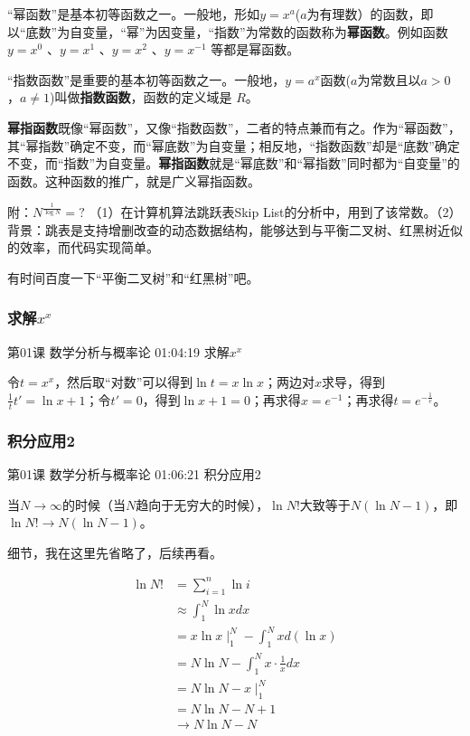 \documentclass[UTF8]{ctexart}
\begin{document}
“幂函数”是基本初等函数之一。一般地，形如$y=x^{a}$($a$为有理数）的函数，即以“底数”为自变量，“幂”为因变量，“指数”为常数的函数称为\textbf{幂函数}。例如函数$y=x^{0}$ 、$y=x^{1}$ 、$y=x^{2}$ 、$y=x^{-1}$ 等都是幂函数。

“指数函数”是重要的基本初等函数之一。一般地，$y=a^{x}$函数($a$为常数且以$a>0$，$a \neq 1$)叫做\textbf{指数函数}，函数的定义域是 $R$。

\textbf{幂指函数}既像“幂函数”，又像“指数函数”，二者的特点兼而有之。作为“幂函数”，其“幂指数”确定不变，而“幂底数”为自变量；相反地，“指数函数”却是“底数”确定不变，而“指数”为自变量。\textbf{幂指函数}就是“幂底数”和“幂指数”同时都为“自变量”的函数。这种函数的推广，就是广义幂指函数。

附：$N^{\frac{1}{\log {N}}}=?$ （1）在计算机算法跳跃表Skip List的分析中，用到了该常数。（2）背景：跳表是支持增删改查的动态数据结构，能够达到与平衡二叉树、红黑树近似的效率，而代码实现简单。

有时间百度一下“平衡二叉树”和“红黑树”吧。

\subsubsection{求解$x^{x}$}

第01课 数学分析与概率论 01:04:19 求解$x^{x}$

令$t=x^{x}$，然后取“对数”可以得到$\ln t = x \ln x$；两边对$x$求导，得到$\frac{1}{t}t'=\ln x + 1$；令$t'=0$，得到$\ln x + 1 = 0$；再求得$x=e^{-1}$；再求得$t=e^{-\frac{1}{e}}$。

\subsubsection{积分应用2}

第01课 数学分析与概率论 01:06:21 积分应用2

当$N \rightarrow \infty$的时候（当$N$趋向于无穷大的时候），$\ln N!$大致等于$N(\ln{N}-1)$，即$\ln{N!} \rightarrow  N(\ln{N}-1)$。

细节，我在这里先省略了，后续再看。

\begin{equation}
\begin{aligned}
\ln{N!}&=\sum_{i=1}^{n} \ln{i} \\
&\approx \int_{1}^{N} \ln {xdx} \\
&=x\ln x \mid_{1}^{N}-\int_{1}^{N} xd(\ln x)\\
&=N\ln N - \int_{1}^{N} x\cdot \frac{1}{x}dx \\
&=N\ln N - x\mid_{1}^{N} \\
&=N\ln N - N + 1 \\
&\rightarrow N\ln N - N
\end{aligned}
\end{equation}
\end{document}
